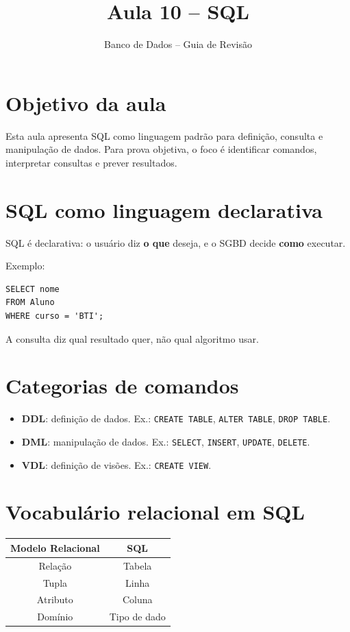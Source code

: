\documentclass[12pt,a4paper]{article}
\title{Aula 10 -- SQL}
\author{Banco de Dados -- Guia de Revisão}
\date{}
\begin{document}
\maketitle
\tableofcontents
\newpage

\section{Objetivo da aula}
Esta aula apresenta SQL como linguagem padrão para definição, consulta e manipulação de dados. Para prova objetiva, o foco é identificar comandos, interpretar consultas e prever resultados.

\section{SQL como linguagem declarativa}
SQL é declarativa: o usuário diz \textbf{o que} deseja, e o SGBD decide \textbf{como} executar.

Exemplo:
\begin{verbatim}
SELECT nome
FROM Aluno
WHERE curso = 'BTI';
\end{verbatim}
A consulta diz qual resultado quer, não qual algoritmo usar.

\section{Categorias de comandos}
\begin{itemize}
    \item \textbf{DDL}: definição de dados. Ex.: \texttt{CREATE TABLE}, \texttt{ALTER TABLE}, \texttt{DROP TABLE}.
    \item \textbf{DML}: manipulação de dados. Ex.: \texttt{SELECT}, \texttt{INSERT}, \texttt{UPDATE}, \texttt{DELETE}.
    \item \textbf{VDL}: definição de visões. Ex.: \texttt{CREATE VIEW}.
\end{itemize}

\section{Vocabulário relacional em SQL}
\begin{center}
\begin{tabular}{|c|c|}
\hline
Modelo Relacional & SQL \\
\hline
Relação & Tabela \\
Tupla & Linha \\
Atributo & Coluna \\
Domínio & Tipo de dado \\
\hline
\end{tabular}
\end{center}
\end{document}
